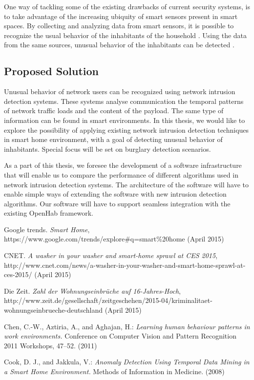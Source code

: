 \documentclass[12pt]{article}
\begin{document}
One way of tackling some of the existing drawbacks of current security systems, is to take advantage of the increasing ubiquity of smart sensors present in smart spaces. By collecting and analyzing data from smart sensors, it is possible to recognize the usual behavior of the inhabitants of the household \cite{behavior}. Using the data from the same sources, unusual behavior of the inhabitants can be detected \cite{anomaly}.

\subsection*{Proposed Solution}
Unusual behavior of network users can be recognized using network intrusion detection systems. These systems analyse communication the temporal patterns of network traffic loads and the content of the payload. The same type of information can be found in smart environments. In this thesis, we would like to explore the possibility of applying existing network intrusion detection techniques in smart home environment, with a goal of detecting unusual behavior of inhabitants. Special focus will be set on burglary detection scenarios.

As a part of this thesis, we foresee the development of a software infrastructure that will enable us to compare the performance of different algorithms used in network intrusion detection systems. The architecture of the software will have to enable simple ways of extending the software with new intrusion detection algorithms. Our software will have to support seamless integration with the existing OpenHab framework.


\begin{thebibliography}{9}

 Google trends. \textit{Smart Home}, https://www.google.com/trends/explore\#q=smart\%20home (April 2015)

 CNET. \textit{A washer in your washer and smart-home sprawl at CES 2015}, http://www.cnet.com/news/a-washer-in-your-washer-and-smart-home-sprawl-at-ces-2015/ (April 2015)

 Die Zeit. \textit{Zahl der Wohnungseinbrüche auf 16-Jahres-Hoch}, http://www.zeit.de/gesellschaft/zeitgeschehen/2015-04/kriminalitaet-wohnungseinbrueche-deutschland (April 2015)

 Chen, C.-W., Aztiria, A., and Aghajan, H.: \textit{Learning human behaviour patterns in work environments.} Conference on Computer Vision and Pattern Recognition 2011 Workshops, 47--52. (2011)

 Cook, D. J., and Jakkula, V.: \textit{Anomaly Detection Using Temporal Data Mining in a Smart Home Environment.} Methods of Information in Medicine. (2008)

\end{thebibliography}






\end{document}
